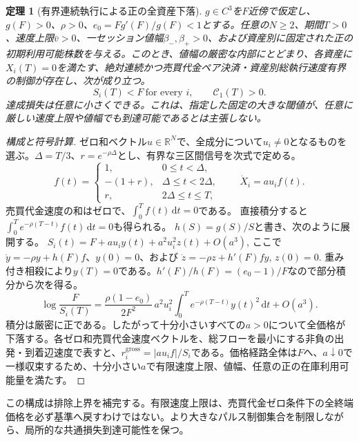 \documentclass[11pt]{article}
\numberwithin{equation}{section}
\newtheorem{theorem}{定理}[section]
\theoremstyle{definition}
\theoremstyle{remark}
\newcommand{\R}{\mathbb{R}}
\newcommand{\dd}{\,\mathrm{d}}
\begin{document}
\begin{theorem}[有界連続執行による正の全資産下落]\label{thm:finite-rate-construct}
$g\in C^3$を$F$近傍で仮定し、$g(F)>0$、$\rho>0$、$e_0=Fg'(F)/g(F)<1$とする。任意の$N\ge2$、期間$T>0$、速度上限$\bar v>0$、一セッション値幅$\beta_-,\beta_+>0$、および資産別に固定された正の初期利用可能株数を与える。このとき、値幅の厳密な内部にとどまり、各資産に$X_i(T)=0$を満たす、\emph{絶対連続}かつ売買代金ペア決済・資産別総執行速度有界の制御が存在し、次が成り立つ。
\begin{equation}\label{eq:local-speed-crash}
 \boxed{\ S_i(T)<F\ \text{for every }i,\qquad \mathcal C_1(T)>0.\ }
\end{equation}
達成損失は任意に小さくできる。これは、指定した固定の大きな閾値が、任意に厳しい速度上限や値幅でも到達可能であるとは主張\emph{しない}。
\end{theorem}
\begin{proof}[構成と符号計算]
ゼロ和ベクトル$u\in\R^N$で、全成分について$u_i\ne0$となるものを選ぶ。$\Delta=T/3$、$r=e^{-\rho\Delta}$とし、有界な三区間信号を次式で定める。
\begin{equation}\label{eq:bounded-control}
 f(t)=
 \begin{cases}
 1,&0\le t<\Delta,\\
 -(1+r),&\Delta\le t<2\Delta,\\
 r,&2\Delta\le t\le T,
 \end{cases}
 \qquad \dot X_i=a u_i f(t).
\end{equation}
売買代金速度の和はゼロで、$\int_0^T f(t)\dd t=0$である。
直接積分すると$\int_0^T e^{-\rho(T-t)}f(t)\dd t=0$も得られる。
$h(S)=g(S)/S$と書き、次のように展開する。
$S_i(t)=F+a u_i y(t)+a^2u_i^2 z(t)+O(a^3)$,
ここで$\dot y=-\rho y+h(F)f$、$y(0)=0$、および
$\dot z=-\rho z+h'(F)f y$, $z(0)=0$.
重み付き相殺により$y(T)=0$である。$h'(F)/h(F)=(e_0-1)/F$なので部分積分から次を得る。
\begin{equation}\label{eq:finite-rate-coefficient}
 \boxed{\ \log\frac{F}{S_i(T)}=
 \frac{\rho(1-e_0)}{2F^2}\,a^2u_i^2
 \int_0^T e^{-\rho(T-t)}y(t)^2\dd t+O(a^3).\ }
\end{equation}
積分は厳密に正である。したがって十分小さいすべての$a>0$について全価格が下落する。各ゼロ和売買代金速度ベクトルを、総フローを最小にする非負の出発・到着辺速度で表すと、$r_i^{\mathrm{gross}}=|a u_i f|/S_i$である。価格経路全体は$F$へ、$a\downarrow0$で一様収束するため、十分小さい$a$で有限速度上限、値幅、任意の正の在庫利用可能量を満たす。
\end{proof}

この構成は排除上界を補完する。有限速度上限は、売買代金ゼロ条件下の全終端価格を必ず基準へ戻すわけではない。より大きなパルス制御集合を制限しながら、局所的な共通損失到達可能性を保つ。
\end{document}
